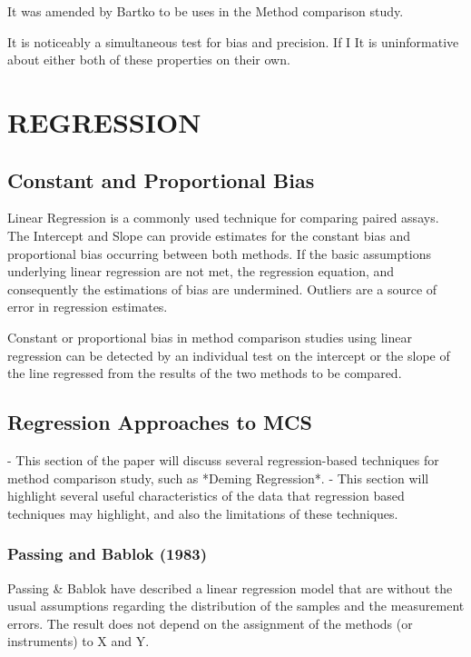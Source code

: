 \documentclass[MAIN.tex]{subfiles}
\begin{document}
It was amended by Bartko to be uses in the Method comparison study.

It is noticeably a simultaneous test for bias and precision. If I It is uninformative about either both of these properties on their own.




\chapter{REGRESSION}%

\section{Constant and Proportional Bias}

Linear Regression is a commonly used technique for comparing paired assays. The Intercept and Slope can provide estimates for the constant bias and proportional bias occurring between both methods. If the basic assumptions underlying linear regression are not met, the regression equation, and consequently the estimations
of bias are undermined. Outliers are a source of error in regression estimates.

Constant or proportional bias in method comparison studies using linear regression can be detected by an individual test on the intercept or the slope of the line regressed from the results of the two methods to be compared.







\section{Regression Approaches to MCS}
- This section of the paper will discuss several regression-based techniques for method comparison study, 
such as *Deming Regression*. 
- This section will highlight several useful characteristics of the data that 
regression based techniques may highlight, and also the limitations of these techniques.






\subsection{Passing and Bablok (1983) }
Passing \& Bablok have described a linear regression model that are without the usual assumptions regarding the distribution of
the samples and the measurement errors. The result does not depend on the assignment of the methods (or instruments) to X and Y.
\end{document}

